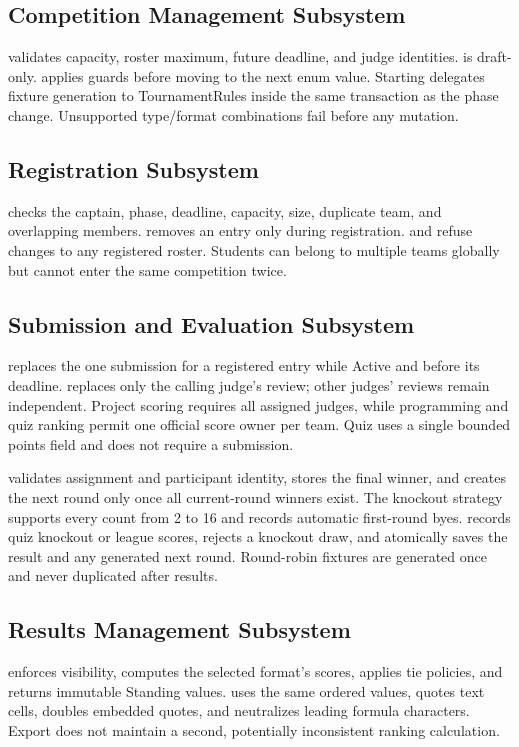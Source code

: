 \documentclass[12pt]{article}
\begin{document}
\subsection{Competition Management Subsystem}
 validates capacity, roster maximum, future deadline, and judge identities.  is draft-only.  applies guards before moving to the next enum value. Starting delegates fixture generation to TournamentRules inside the same transaction as the phase change. Unsupported type/format combinations fail before any mutation.
\subsection{Registration Subsystem}
 checks the captain, phase, deadline, capacity, size, duplicate team, and overlapping members.  removes an entry only during registration.  and  refuse changes to any registered roster. Students can belong to multiple teams globally but cannot enter the same competition twice.
\subsection{Submission and Evaluation Subsystem}
 replaces the one submission for a registered entry while Active and before its deadline.  replaces only the calling judge's review; other judges' reviews remain independent. Project scoring requires all assigned judges, while programming and quiz ranking permit one official score owner per team. Quiz uses a single bounded points field and does not require a submission.

 validates assignment and participant identity, stores the final winner, and creates the next round only once all current-round winners exist. The knockout strategy supports every count from 2 to 16 and records automatic first-round byes.  records quiz knockout or league scores, rejects a knockout draw, and atomically saves the result and any generated next round. Round-robin fixtures are generated once and never duplicated after results.
\subsection{Results Management Subsystem}
 enforces visibility, computes the selected format's scores, applies tie policies, and returns immutable Standing values.  uses the same ordered values, quotes text cells, doubles embedded quotes, and neutralizes leading formula characters. Export does not maintain a second, potentially inconsistent ranking calculation.
\end{document}
